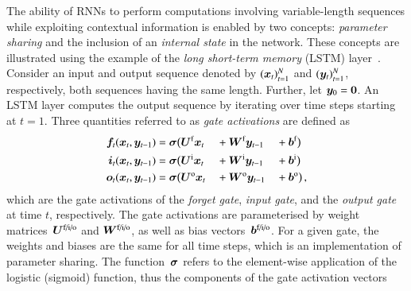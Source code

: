
The ability of RNNs to perform computations involving variable-length sequences
while exploiting contextual information is enabled by two concepts:
\emph{parameter sharing} and the inclusion of an \emph{internal state} in the
network. These concepts are illustrated using the example of the \emph{long
  short-term memory} (LSTM) layer~\cite{lstm,gers2000learning}. Consider an
input and output sequence denoted by $(\bm{x}_{t})_{t = 1}^{N}$ and
$(\bm{y}_{t})_{t = 1}^{N}$, respectively, both sequences having the same
length. Further, let $\bm{y}_{0} = \bm{0}$. An LSTM layer computes the
output sequence by iterating over time steps starting at $t = 1$. Three
quantities referred to as \emph{gate activations} are defined
as~\cite{Goodfellow-et-al-2016}
\begin{alignat*}{3}
  \myvec{f}_{t}(\myvec{x}_{t}, \myvec{y}_{t-1}) &= \myvec{\sigma}\bigl(\myvec{U}^{\text{f}}  \myvec{x}_{t} &&+ \myvec{W}^{\text{f}}  \myvec{y}_{t - 1} &&+ \myvec{b}^{\text{f}}\bigr) \\
  \myvec{i}_{t}(\myvec{x}_{t}, \myvec{y}_{t-1}) &= \myvec{\sigma}\bigl(\myvec{U}^{\text{i}}  \myvec{x}_{t} &&+ \myvec{W}^{\text{i}}  \myvec{y}_{t - 1} &&+ \myvec{b}^{\text{i}}\bigr) \\
  \myvec{o}_{t}(\myvec{x}_{t}, \myvec{y}_{t-1}) &= \myvec{\sigma}\bigl(\myvec{U}^{\text{o}}  \myvec{x}_{t} &&+ \myvec{W}^{\text{o}}  \myvec{y}_{t - 1} &&+ \myvec{b}^{\text{o}}\bigr) \,\text{,}                                                       %
\end{alignat*}
which are the gate activations of the \emph{forget gate}, \emph{input gate}, and
the \emph{output gate} at time $t$, respectively. The gate activations are
parameterised by weight matrices~$\bm{U}^{\text{f/i/o}}$ and
$\bm{W}^{\text{f/i/o}}$, as well as bias
vectors~$\bm{b}^{\text{f/i/o}}$. For a given gate, the weights and biases are
the same for all time steps, which is an implementation of parameter sharing.
The function~$\bm{\sigma}$ refers to the element-wise application of the
logistic (sigmoid) function, thus the components of the gate activation vectors
